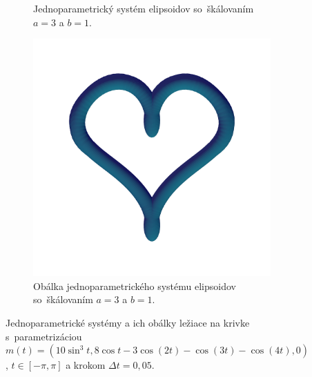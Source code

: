 \begin{figure}[h]
\begin{subfigure}[t]{0.49\textwidth}
        	\caption{Jednoparametrický systém elipsoidov so~škálovaním $a=3$ a $b=1$.}
        \label{fig:plocha13}
    \end{subfigure}
    \hfill
    \begin{subfigure}[t]{0.49\textwidth}
        \centering
        \includegraphics[width=\textwidth, trim=0mm 50mm 0mm 50mm, clip=true]{images/heart_ellipsoids_envelope.png}
        	\caption{Obálka jednoparametrického systému elipsoidov so~škálovaním $a=3$ a $b=1$.}
        \label{fig:plocha14}
    \end{subfigure}
    \caption[Jednoparametrické systémy a ich obálky ležiace na krivke srdce.]{Jednoparametrické systémy a ich obálky ležiace na krivke s~parametrizáciou $m(t)=(10\sin^{3}t, 8 \cos t-3\cos(2t) -\cos(3t)-\cos (4t), 0)$, $t \in [-\pi, \pi]$ a krokom $\Delta t = 0,05.$}
    \label{fig:katalogIII}
\end{figure}

